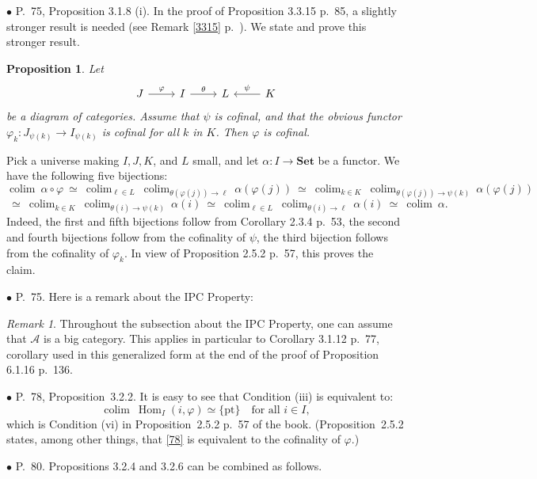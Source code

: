 \documentclass[12pt]{article}
\newtheorem{prop}[thm]{Proposition}
\theoremstyle{remark}%
\newtheorem{rk}[thm]{Remark}%
\newcommand{\bu}{\bullet}
\newcommand{\n}{\noindent}
\newcommand{\A}{\mathcal A}
\newcommand{\Set}{\textbf{Set}}
\newcommand{\p}{\varphi}
\newcommand{\pt}{\{\text{pt}\}}
\newcommand{\pr}{Proposition}
\DeclareMathOperator*{\coli}{colim}
\DeclareMathOperator*{\co}{colim}
\DeclareMathOperator{\h}{Hom}
\begin{document}
\n$\bu$ P.~75, Proposition 3.1.8 (i). In the proof of Proposition 3.3.15 p.~85, a slightly stronger result is needed (see Remark \ref{3315} p.~\pageref{3315}). We state and prove this stronger result. 
%
\begin{prop}\label{318i} 
% 
Let 
$$
\begin{tikzcd}
J\ar{r}{\p}&I\ar{r}{\theta}&L&K\ar{l}[swap]{\psi}
\end{tikzcd}
$$
be a diagram of categories. Assume that $\psi$ is cofinal, and that the obvious functor $\p_k:J_{\psi(k)}\to I_{\psi(k)}$ is cofinal for all $k$ in $K$. Then $\p$ is cofinal. 
% 
\end{prop} 
% 
\n{\em Proof.} Pick a universe making $I,J,K$, and $L$ small, and let $\alpha:I\to\Set$ be a functor. We have the following five bijections:
$$
\coli\ \alpha\circ\p\ \simeq\ 
%
\coli_{\ell\in L}\ \coli_{\theta(\p(j))\to\ell}\ \alpha(\p(j))\ \simeq\ 
%
\coli_{k\in K}\ \coli_{\theta(\p(j))\to\psi(k)}\ \alpha(\p(j))
$$
$$
\ \simeq\ \coli_{k\in K}\ \coli_{\theta(i)\to\psi(k)}\ \alpha(i)\ \simeq\ 
%
\coli_{\ell\in L}\ \coli_{\theta(i)\to\ell}\ \alpha(i)\ \simeq\ 
%
\coli\ \alpha.
$$
Indeed, the first and fifth bijections follow from Corollary 2.3.4 p.~53, the second and fourth bijections follow from the cofinality of $\psi$, the third bijection follows from the cofinality of $\p_k$. In view of Proposition 2.5.2 p.~57, this proves the claim. 


\n$\bu$ P.~75. Here is a remark about the IPC Property: 
% 
\begin{rk}\label{ipc} 
Throughout the subsection about the IPC Property, one can assume that $\A$ is a big category. This applies in particular to Corollary 3.1.12 p.~77, corollary used in this generalized form at the end of the proof of Proposition 6.1.16 p.~136. 
\end{rk} 


\n$\bu$ P.~78, \pr\ 3.2.2. It is easy to see that Condition (iii) is equivalent to: 
%
\begin{equation}\label{78} 
\co\ \h_I(i,\p)\simeq\pt\quad\text{for all }i\in I, 
\end{equation} 
% 
which is Condition (vi) in \pr\ 2.5.2 p.~57 of the book. (\pr\ 2.5.2 states, among other things, that \eqref{78} is equivalent to the cofinality of $\p$.) 


\n$\bu$ P.~80. \pr s 3.2.4 and 3.2.6 can be combined as follows. 
\end{document}

